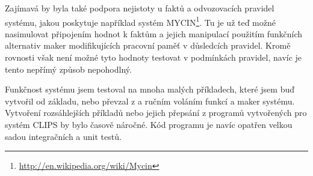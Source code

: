 Zajímavá by byla také podpora nejistoty u faktů a odvozovacích pravidel
systému, jakou poskytuje například systém
MYCIN\footnote{\url{http://en.wikipedia.org/wiki/Mycin}}. Tu je už teď možné
nasimulovat připojením hodnot k faktům a jejich manipulací použitím funkčních
alternativ maker modifikujících pracovní paměť v důsledcích pravidel. Kromě
rovnosti však není možné tyto hodnoty testovat v podmínkách pravidel, navíc je
tento nepřímý způsob nepohodlný.

Funkčnost systému jsem testoval na mnoha malých příkladech, které jsem buď
vytvořil od základu, nebo převzal z \cite{paradigms} a ručním voláním funkcí a
maker systému. Vytvoření rozsáhlejších příkladů nebo jejich přepsání z programů
vytvořených pro systém CLIPS by bylo časově náročné. Kód programu je navíc
opatřen velkou sadou integračních a unit testů.
